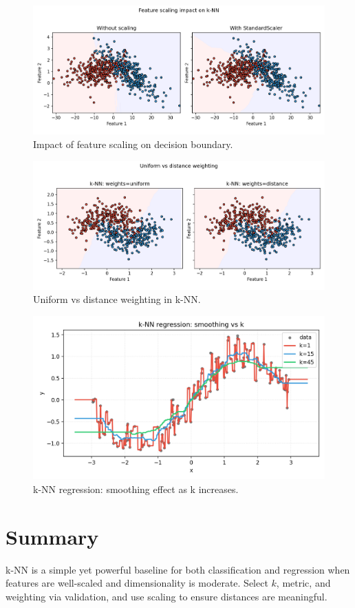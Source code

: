 \documentclass[11pt]{article}
\begin{document}
\begin{figure}[H]
  \centering
  \includegraphics[width=0.95\linewidth]{knn_scaling_effect.png}
  \caption{Impact of feature scaling on decision boundary.}
  \label{fig:knn_scale}
\end{figure}
\FloatBarrier

\begin{figure}[H]
  \centering
  \includegraphics[width=0.95\linewidth]{knn_weight_compare.png}
  \caption{Uniform vs distance weighting in k-NN.}
  \label{fig:knn_weight}
\end{figure}
\FloatBarrier

\begin{figure}[H]
  \centering
  \includegraphics[width=0.85\linewidth]{knn_regression_curve.png}
  \caption{k-NN regression: smoothing effect as k increases.}
  \label{fig:knn_reg}
\end{figure}
\FloatBarrier

\section{Summary}
k-NN is a simple yet powerful baseline for both classification and regression when features are well-scaled and dimensionality is moderate. Select $k$, metric, and weighting via validation, and use scaling to ensure distances are meaningful.
\end{document}
